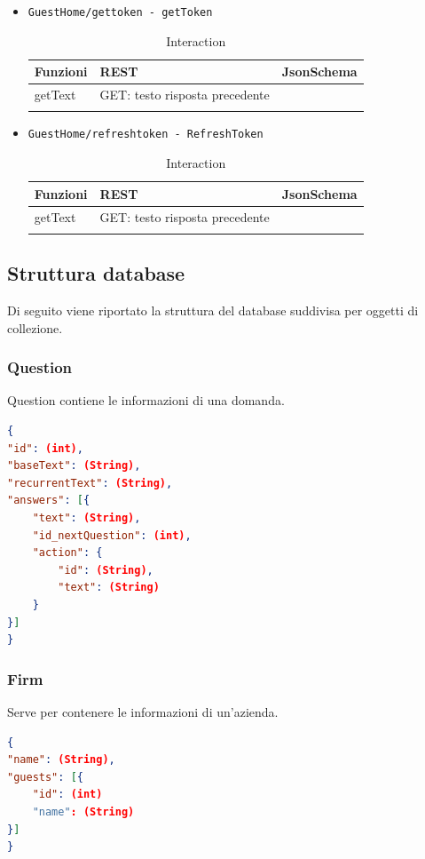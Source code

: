 \documentclass[../DefinizioneDiProdotto_v2.0.0.tex]{subfiles}
\begin{document}
\begin{itemize}
	\item \texttt{GuestHome/gettoken - getToken}
	      \begin{longtable}[c] { >{\centering\arraybackslash}p{3cm} >{\centering\arraybackslash}p{6cm} >{\centering\arraybackslash}p{3cm}}
	      	\toprule
	      	\centerline{\textbf{Funzioni}} & \centerline{\textbf{REST}}     & \centerline{\textbf{JsonSchema}} \\
	      	\midrule
	      	getText                        & GET: testo risposta precedente &                                  \\
	      	\bottomrule
	      	\caption{Interaction}
	      \end{longtable}
	\item \texttt{GuestHome/refreshtoken - RefreshToken}
	      \begin{longtable}[c] { >{\centering\arraybackslash}p{3cm} >{\centering\arraybackslash}p{6cm} >{\centering\arraybackslash}p{3cm}}
	      	\toprule
	      	\centerline{\textbf{Funzioni}} & \centerline{\textbf{REST}}     & \centerline{\textbf{JsonSchema}} \\
	      	\midrule
	      	getText                        & GET: testo risposta precedente &                                  \\
	      	\bottomrule
	      	\caption{Interaction}
	      \end{longtable}
\end{itemize}


\subsection{Struttura database}
Di seguito viene riportato la struttura del database suddivisa per oggetti di collezione.
\subsubsection{Question}
Question contiene le informazioni di una domanda.
\begin{lstlisting}[language=json,firstnumber=1]
{
"id": (int),
"baseText": (String),
"recurrentText": (String),
"answers": [{
	"text": (String),
	"id_nextQuestion": (int),
	"action": {
		"id": (String),
		"text": (String)
	}
}]
}
\end{lstlisting}

\subsubsection{Firm}
Serve per contenere le informazioni di un'azienda.
\begin{lstlisting}[language=json,firstnumber=1]
{
"name": (String),
"guests": [{
	"id": (int)
	"name": (String)
}]
}
\end{lstlisting}
\end{document}
